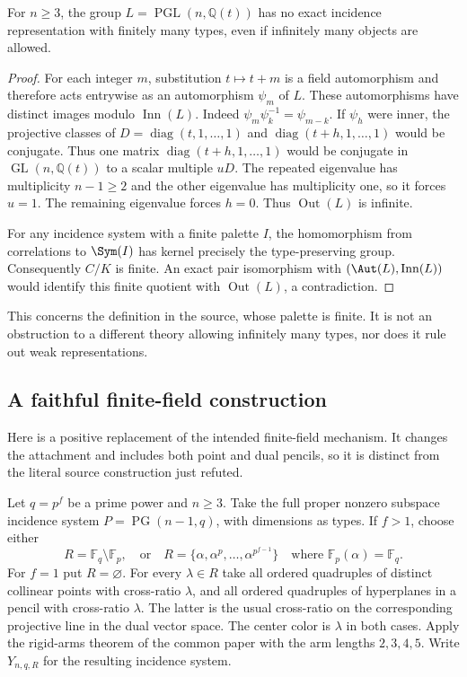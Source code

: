 \begin{proposition}
\label{A126.InfiniteField}
For $n\ge3$, the group $L=\operatorname{PGL}(n,\mathbb Q(t))$ has no
exact incidence representation with finitely many types, even if infinitely
many objects are allowed.
\end{proposition}
\begin{proof}
For each integer $m$, substitution $t\mapsto t+m$ is a field automorphism
and therefore acts entrywise as an automorphism $\psi_m$ of $L$.
These automorphisms have distinct images modulo $\operatorname{Inn}(L)$.
Indeed $\psi_m\psi_k^{-1}=\psi_{m-k}$. If $\psi_h$ were inner, the
projective classes of $D=\operatorname{diag}(t,1,\ldots,1)$ and
$\operatorname{diag}(t+h,1,\ldots,1)$ would be conjugate. Thus one
matrix $\operatorname{diag}(t+h,1,\ldots,1)$ would be conjugate in
$\operatorname{GL}(n,\mathbb Q(t))$ to a scalar multiple $uD$. The repeated eigenvalue has multiplicity
$n-1\ge2$ and the other eigenvalue has multiplicity one, so it forces
$u=1$. The remaining eigenvalue forces $h=0$. Thus
$\operatorname{Out}(L)$ is infinite.

For any incidence system with a finite palette $I$, the homomorphism
from correlations to $\Sym(I)$ has kernel precisely the type-preserving
group. Consequently $C/K$ is finite. An exact pair isomorphism with
$(\Aut(L),\operatorname{Inn}(L))$ would identify this finite quotient
with $\operatorname{Out}(L)$, a contradiction.
\end{proof}
This concerns the definition in the source, whose palette is finite.
It is not an obstruction to a different theory allowing infinitely
many types, nor does it rule out weak representations.

\subsection{A faithful finite-field construction}
Here is a positive replacement of the intended finite-field mechanism.
It changes the attachment and includes both point and dual pencils, so
it is distinct from the literal source construction just refuted.

Let $q=p^f$ be a prime power and $n\ge3$. Take the full proper nonzero
subspace incidence system $P=\operatorname{PG}(n-1,q)$, with dimensions
as types. If $f>1$, choose either
\[
R=\mathbb F_q\setminus\mathbb F_p,
\quad\text{or}\quad
R=\{\alpha,\alpha^p,\ldots,\alpha^{p^{f-1}}\}
\quad\text{where }\mathbb F_p(\alpha)=\mathbb F_q.
\]
For $f=1$ put $R=\varnothing$. For every $\lambda\in R$ take all ordered
quadruples of distinct collinear points with cross-ratio $\lambda$,
and all ordered quadruples of hyperplanes in a pencil with cross-ratio
$\lambda$. The latter is the usual cross-ratio on the corresponding
projective line in the dual vector space. The center color is
$\lambda$ in both cases. Apply the rigid-arms theorem of the common paper with the arm lengths
$2,3,4,5$. Write $Y_{n,q,R}$ for the resulting incidence system.

